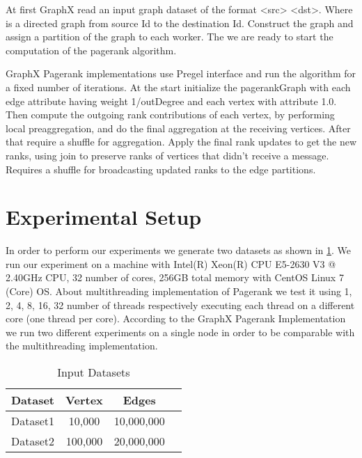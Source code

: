 \documentclass[paper=a4, fontsize=11pt]{scrartcl} %
\numberwithin{equation}{section} %
\numberwithin{figure}{section} %
\numberwithin{table}{section} %
\begin{document}
At first GraphX read an input graph dataset of the format <src> <dst>. Where is
a directed graph from source Id to the destination Id. Construct the graph and
assign a partition of the graph to each worker. The we are ready to start the
computation of the pagerank algorithm.

GraphX Pagerank implementations use Pregel interface and run the algorithm for a
fixed number of iterations. At the start initialize the pagerankGraph with each
edge attribute having weight 1/outDegree and each vertex with attribute 1.0.
Then compute the outgoing rank contributions of each vertex, by performing local
preaggregation, and do the final aggregation at the receiving vertices.  After
that require a shuffle for aggregation. Apply the final rank updates to get the
new ranks, using join to preserve ranks of vertices that didn't receive a
message.  Requires a shuffle for broadcasting updated ranks to the edge
partitions.

\section{Experimental Setup}
In order to perform our experiments we generate two datasets as shown in
\ref{tab:dataset}. We run our experiment on a machine with Intel(R) Xeon(R) CPU
E5-2630 V3 @ 2.40GHz CPU, 32 number of cores, 256GB total memory with CentOS
Linux 7 (Core) OS. 
About multithreading implementation of Pagerank we test it
using 1, 2, 4, 8, 16, 32 number of threads respectively executing each thread on
a different core (one thread per core). According to the GraphX Pagerank
Implementation we run two different experiments on a single node in order to be
comparable with the multithreading implementation. 


\begin{table}
\centering
    \begin{tabular}{|l|c|c|c|}
        \hline
        \textbf{Dataset} &\textbf{Vertex} &\textbf{Edges} \\
        \hline
        Dataset1  &10,000  &10,000,000 \\
        \hline
        Dataset2   &100,000  &20,000,000 \\
        \hline
    \end{tabular}
    \caption{Input Datasets}
    \label{tab:dataset}
\end{table}


\end{document}
